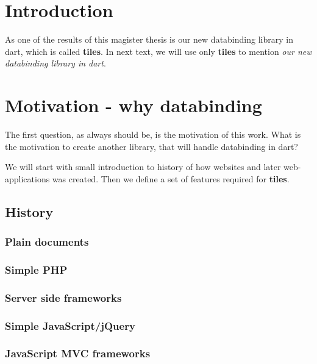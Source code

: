 \documentclass[oneside, 12pt]{book}
\begin{document}
\chapter*{Introduction}\label{chap:intro}

As one of the results of this magister thesis is our new databinding library in dart, 
which is called \textbf{tiles}. 
In next  text, we will use only \textbf{tiles} to mention \textit{our new databinding library in dart}.


\pagestyle{headings}
\chapter{Motivation - why databinding}\label{chap:motivatio}

The first question, as always should be, is the motivation of this work. 
What is the motivation to create another library, that will handle databinding in dart?

We will start with small introduction to history of how websites and later web-applications was created. 
Then we define a set of features required for \textbf{tiles}.

\section{History}\label{sec:history}
\subsection{Plain documents}\label{subsec:history-plain-doc}
\subsection{Simple PHP}\label{subsec:history-server-side-scripts}
\subsection{Server side frameworks}\label{subsec:history-server-side-frameworks}
\subsection{Simple JavaScript/jQuery}\label{subsec:history-jquery}
\subsection{JavaScript MVC frameworks}\label{subsec:history-js-mvc}
\end{document}
